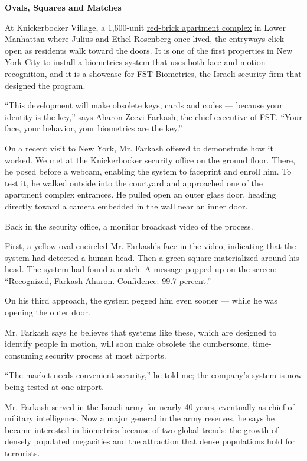 \textbf{Ovals, Squares and Matches}

At Knickerbocker Village, a 1,600-unit
\href{http://www.knickvill.com/en/}{red-brick apartment complex} in
Lower Manhattan where Julius and Ethel Rosenberg once lived, the
entryways click open as residents walk toward the doors. It is one of
the first properties in New York City to install a biometrics system
that uses both face and motion recognition, and it is a showcase for
\href{http://www.fst21.com/}{FST Biometrics}, the Israeli security firm
that designed the program.

``This development will make obsolete keys, cards and codes --- because
your identity is the key,'' says Aharon Zeevi Farkash, the chief
executive of FST. ``Your face, your behavior, your biometrics are the
key.''

On a recent visit to New York, Mr. Farkash offered to demonstrate how it
worked. We met at the Knickerbocker security office on the ground floor.
There, he posed before a webcam, enabling the system to faceprint and
enroll him. To test it, he walked outside into the courtyard and
approached one of the apartment complex entrances. He pulled open an
outer glass door, heading directly toward a camera embedded in the wall
near an inner door.

Back in the security office, a monitor broadcast video of the process.

First, a yellow oval encircled Mr. Farkash's face in the video,
indicating that the system had detected a human head. Then a green
square materialized around his head. The system had found a match. A
message popped up on the screen: ``Recognized, Farkash Aharon.
Confidence: 99.7 percent.''

On his third approach, the system pegged him even sooner --- while he
was opening the outer door.

Mr. Farkash says he believes that systems like these, which are designed
to identify people in motion, will soon make obsolete the cumbersome,
time-consuming security process at most airports.

``The market needs convenient security,'' he told me; the company's
system is now being tested at one airport.

Mr. Farkash served in the Israeli army for nearly 40 years, eventually
as chief of military intelligence. Now a major general in the army
reserves, he says he became interested in biometrics because of two
global trends: the growth of densely populated megacities and the
attraction that dense populations hold for terrorists.

